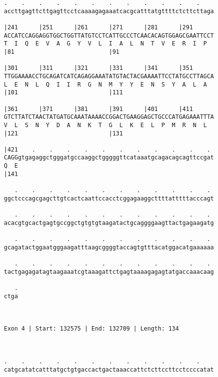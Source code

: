 \documentclass{article}
\begin{document}
\begin{Verbatim}
.    .    .    .    .    .    .    .    .    .    .    .    
accttgagttcttgagttcctcaaaagagaaatcacgcatttatgttttctcttcttaga
                                                            
|241      |251      |261      |271      |281      |291      
ACCATCCAGGAGGTGGCTGGTTATGTCCTCATTGCCCTCAACACAGTGGAGCGAATTCCT
T  I  Q  E  V  A  G  Y  V  L  I  A  L  N  T  V  E  R  I  P  
|81                           |91                           
  
|301      |311      |321      |331      |341      |351      
TTGGAAAACCTGCAGATCATCAGAGGAAATATGTACTACGAAAATTCCTATGCCTTAGCA
L  E  N  L  Q  I  I  R  G  N  M  Y  Y  E  N  S  Y  A  L  A  
|101                          |111                          
  
|361      |371      |381      |391      |401      |411      
GTCTTATCTAACTATGATGCAAATAAAACCGGACTGAAGGAGCTGCCCATGAGAAATTTA
V  L  S  N  Y  D  A  N  K  T  G  L  K  E  L  P  M  R  N  L  
|121                          |131                          
  
|421    .    .    .    .    .    .    .    .    .    .    . 
CAGGgtgagaggctgggatgccaaggctgggggttcataaatgcagacagcagttccgat
Q  E                                                        
|141                                                        
  
   .    .    .    .    .    .    .    .    .    .    .    . 
ggctcccagcgagcttgtcactcaattccacctcggagaaggcttttatttttacccagt
                                                            
   .    .    .    .    .    .    .    .    .    .    .    . 
acacgtgcactgagtgccggctgtgtgtaagatactgcaggggaagttactgagaagatg
                                                            
   .    .    .    .    .    .    .    .    .    .    .    . 
gcagatactggaatgggaagatttaagcggggtaccagtgtttacatggacatgaaaaaa
                                                            
   .    .    .    .    .    .    .    .    .    .    .    . 
tactgagagatagtaagaaatcgtaaagattctgagtaaaagagagtatgaccaaacaag
                                                            
   .
ctga
    
    
 
Exon 4 | Start: 132575 | End: 132709 | Length: 134



.    .    .    .    .    .    .    .    .    .    .    .    
catgcatatcatttatgctgtgaccactgactaaaccattctcttccttcctccccatat
                                                            

\end{Verbatim}
\end{document}
